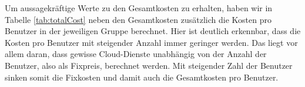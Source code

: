 \documentclass{article}
\begin{document}
Um aussagekräftige Werte zu den Gesamtkosten zu erhalten, haben wir in Tabelle \ref{tab:totalCost} neben den Gesamtkosten zusätzlich die Kosten pro Benutzer in der jeweiligen Gruppe berechnet. Hier ist deutlich erkennbar, dass die Kosten pro Benutzer mit steigender Anzahl immer geringer werden. Das liegt vor allem daran, dass gewisse Cloud-Dienste unabhängig von der Anzahl der Benutzer, also als Fixpreis, berechnet werden. Mit steigender Zahl der Benutzer sinken somit die Fixkosten und damit auch die Gesamtkosten pro Benutzer.

\newpage

\appendix


\newpage

{}

\end{document}
